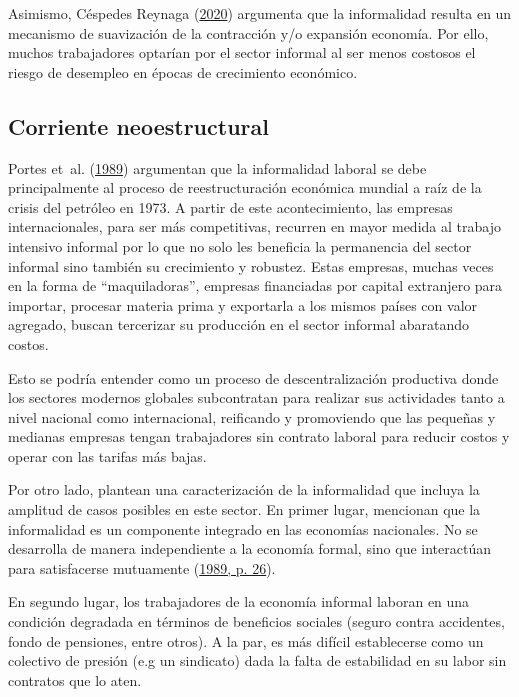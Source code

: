 \documentclass[
  letterpaper,
  12pt,
  oneside,
  spanish,
  doublespacing,
  headsepline,
  parskip]{MastersDoctoralThesis}
\begin{document}
Asimismo, Céspedes Reynaga
(\protect\hyperlink{ref-cuxe9spedesreynaga2020}{2020}) argumenta que la
informalidad resulta en un mecanismo de suavización de la contracción
y/o expansión economía. Por ello, muchos trabajadores optarían por el
sector informal al ser menos costosos el riesgo de desempleo en épocas
de crecimiento económico.

\hypertarget{corriente-neoestructural}{%
\subsection{Corriente neoestructural}\label{corriente-neoestructural}}

Portes et~al. (\protect\hyperlink{ref-theinfo1989}{1989}) argumentan que
la informalidad laboral se debe principalmente al proceso de
reestructuración económica mundial a raíz de la crisis del petróleo en
1973. A partir de este acontecimiento, las empresas internacionales,
para ser más competitivas, recurren en mayor medida al trabajo intensivo
informal por lo que no solo les beneficia la permanencia del sector
informal sino también su crecimiento y robustez. Estas empresas, muchas
veces en la forma de ``maquiladoras'', empresas financiadas por capital
extranjero para importar, procesar materia prima y exportarla a los
mismos países con valor agregado, buscan tercerizar su producción en el
sector informal abaratando costos.

Esto se podría entender como un proceso de descentralización productiva
donde los sectores modernos globales subcontratan para realizar sus
actividades tanto a nivel nacional como internacional, reificando y
promoviendo que las pequeñas y medianas empresas tengan trabajadores sin
contrato laboral para reducir costos y operar con las tarifas más bajas.

Por otro lado, plantean una caracterización de la informalidad que
incluya la amplitud de casos posibles en este sector. En primer lugar,
mencionan que la informalidad es un componente integrado en las
economías nacionales. No se desarrolla de manera independiente a la
economía formal, sino que interactúan para satisfacerse mutuamente
(\protect\hyperlink{ref-theinfo1989}{1989, p. 26}).

En segundo lugar, los trabajadores de la economía informal laboran en
una condición degradada en términos de beneficios sociales (seguro
contra accidentes, fondo de pensiones, entre otros). A la par, es más
difícil establecerse como un colectivo de presión (e.g un sindicato)
dada la falta de estabilidad en su labor sin contratos que lo aten.
\end{document}
